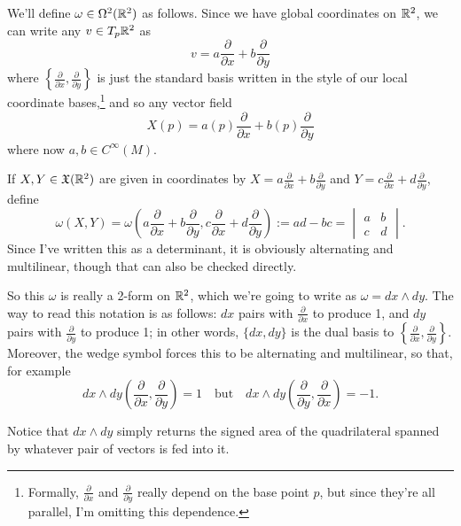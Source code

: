 \begin{example}\label{ex:area form on R^2}
	We'll define $\omega \in \Omega^2(\mathbb{R}^2)$ as follows. Since we have global coordinates on $\mathbb{R}^2$, we can write any $v \in T_p\mathbb{R}^2$ as
	\[
		v = a \frac{\partial}{\partial x} + b \frac{\partial}{\partial y}
	\]
	where $\left\{ \frac{\partial}{\partial x}, \frac{\partial}{\partial y} \right\}$ is just the standard basis written in the style of our local coordinate bases,\footnote{Formally, $\frac{\partial}{\partial x}$ and $\frac{\partial}{\partial y}$ really depend on the base point $p$, but since they're all parallel, I'm omitting this dependence.} and so any vector field
	\[
		X(p) = a(p) \frac{\partial}{\partial x} + b(p) \frac{\partial}{\partial y}
	\]
	where now $a,b \in C^\infty(M)$. 
	
	If $X,Y \in \mathfrak{X}(\mathbb{R}^2)$ are given in coordinates by $X = a \frac{\partial}{\partial x} + b \frac{\partial}{\partial y}$ and $Y = c \frac{\partial}{\partial x} + d \frac{\partial}{\partial y}$, define
	\[
		\omega(X,Y) = \omega \left(a \frac{\partial}{\partial x} + b \frac{\partial}{\partial y}, c \frac{\partial}{\partial x} + d \frac{\partial}{\partial y} \right) := ad-bc = \begin{vmatrix} a & b \\ c & d \end{vmatrix}.
	\]
	Since I've written this as a determinant, it is obviously alternating and multilinear, though that can also be checked directly. 
	
	So this $\omega$ is really a 2-form on $\mathbb{R}^2$, which we're going to write as $\omega = dx \wedge dy$. The way to read this notation is as follows: $dx$ pairs with $\frac{\partial}{\partial x}$ to produce 1, and $dy$ pairs with $\frac{\partial}{\partial y}$ to produce 1; in other words, $\{dx, dy\}$ is the dual basis to $\left\{ \frac{\partial}{\partial x}, \frac{\partial}{\partial y} \right\}$. Moreover, the wedge symbol forces this to be alternating and multilinear, so that, for example 
	\[
		dx \wedge dy \left(\frac{\partial}{\partial x}, \frac{\partial}{\partial y} \right) = 1 \quad \text{but} \quad dx \wedge dy \left(\frac{\partial}{\partial y}, \frac{\partial}{\partial x} \right) = -1.
	\]
	
	Notice that $dx \wedge dy$ simply returns the signed area of the quadrilateral spanned by whatever pair of vectors is fed into it.
\end{example}

